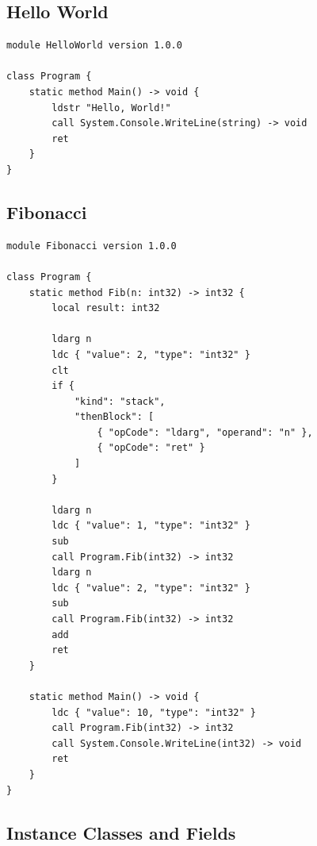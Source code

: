 \documentclass[11pt,a4paper]{article}
\begin{document}
\subsection{Hello World}

\begin{lstlisting}[style=textir, caption={Hello World in TextIR}]
module HelloWorld version 1.0.0

class Program {
    static method Main() -> void {
        ldstr "Hello, World!"
        call System.Console.WriteLine(string) -> void
        ret
    }
}
\end{lstlisting}

\subsection{Fibonacci}

\begin{lstlisting}[style=textir, caption={Recursive Fibonacci}]
module Fibonacci version 1.0.0

class Program {
    static method Fib(n: int32) -> int32 {
        local result: int32

        ldarg n
        ldc { "value": 2, "type": "int32" }
        clt
        if {
            "kind": "stack",
            "thenBlock": [
                { "opCode": "ldarg", "operand": "n" },
                { "opCode": "ret" }
            ]
        }

        ldarg n
        ldc { "value": 1, "type": "int32" }
        sub
        call Program.Fib(int32) -> int32
        ldarg n
        ldc { "value": 2, "type": "int32" }
        sub
        call Program.Fib(int32) -> int32
        add
        ret
    }

    static method Main() -> void {
        ldc { "value": 10, "type": "int32" }
        call Program.Fib(int32) -> int32
        call System.Console.WriteLine(int32) -> void
        ret
    }
}
\end{lstlisting}

\subsection{Instance Classes and Fields}
\end{document}
